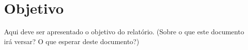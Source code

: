 \section{Objetivo}

Aqui deve ser apresentado o objetivo do relatório. (Sobre o que este documento irá versar? O que esperar deste documento?)
